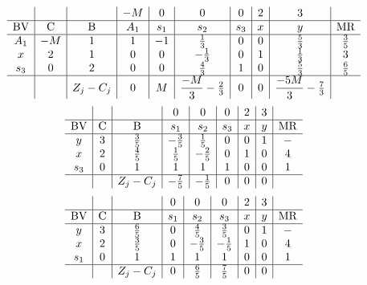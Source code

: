 \documentclass{article}
\begin{document}
\begin{align*}
\begin{array}{c|c|c|c|c|c|c|c|c|c}
 &  &  & -M & 0 & 0 & 0 & 2 & 3 & \\
\hline
\text{BV} & \text{C} & \text{B} & A_{1} & s_{1} & s_{2} & s_{3} & x & y & \text{MR} \\
\hline
A_{1} & -M & 1 & 1 & -1 & \frac{1}{3} & 0 & 0 & \frac{5}{3} & \frac{3}{5} \\
x & 2 & 1 & 0 & 0 & -\frac{1}{3} & 0 & 1 & \frac{1}{3} & 3 \\
s_{3} & 0 & 2 & 0 & 0 & \frac{4}{3} & 1 & 0 & \frac{5}{3} & \frac{6}{5} \\
\hline
 &  & Z_j-C_j & 0 & M & \dfrac{-M}{3} - \frac{2}{3} & 0 & 0 & \dfrac{-5M}{3} - \frac{7}{3} & \\
\end{array}
\end{align*}
\begin{align*}
\begin{array}{c|c|c|c|c|c|c|c|c}
 &  &  & 0 & 0 & 0 & 2 & 3 & \\
\hline
\text{BV} & \text{C} & \text{B} & s_{1} & s_{2} & s_{3} & x & y & \text{MR} \\
\hline
y & 3 & \frac{3}{5} & -\frac{3}{5} & \frac{1}{5} & 0 & 0 & 1 & - \\
x & 2 & \frac{4}{5} & \frac{1}{5} & -\frac{2}{5} & 0 & 1 & 0 & 4 \\
s_{3} & 0 & 1 & 1 & 1 & 1 & 0 & 0 & 1 \\
\hline
 &  & Z_j-C_j & -\frac{7}{5} & -\frac{1}{5} & 0 & 0 & 0 & \\
\end{array}
\end{align*}
\begin{align*}
\begin{array}{c|c|c|c|c|c|c|c|c}
 &  &  & 0 & 0 & 0 & 2 & 3 & \\
\hline
\text{BV} & \text{C} & \text{B} & s_{1} & s_{2} & s_{3} & x & y & \text{MR} \\
\hline
y & 3 & \frac{6}{5} & 0 & \frac{4}{5} & \frac{3}{5} & 0 & 1 & - \\
x & 2 & \frac{3}{5} & 0 & -\frac{3}{5} & -\frac{1}{5} & 1 & 0 & 4 \\
s_{1} & 0 & 1 & 1 & 1 & 1 & 0 & 0 & 1 \\
\hline
 &  & Z_j-C_j & 0 & \frac{6}{5} & \frac{7}{5} & 0 & 0 & \\
\end{array}
\end{align*}
\end{document}
